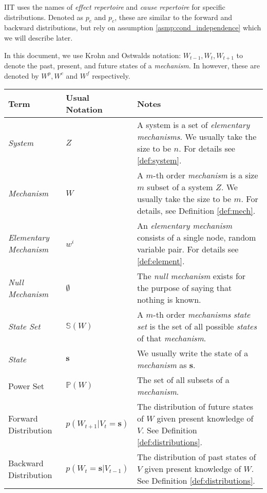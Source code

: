 \begin{definition}
	{IIT \cite{oizumi2014phenomenology} uses the names of \textit{effect repertoire} and \textit{cause repertoire} for specific distributions. Denoted as $p_e$ and $p_c$, these are similar to the forward and backward distributions, but rely on assumption \ref{asmp:cond_independence} which we will describe later. }
\end{definition}


\begin{remark}
	In this document, we use Krohn and Ostwalds  \cite{krohn2016computing} notation: $W_{t-1}, W_t, W_{t+1}$ to denote the past, present, and future states of a \textit{mechanism}. In \cite{oizumi2014phenomenology} however, these are denoted by $W^p, W^c$ and $W^f$ respectively.
\end{remark}

\begin{tabularx}{\textwidth}{ll X}
	Term & Usual Notation & Notes \\
	\hline
	\endfirsthead
	\hline
	\endhead
	\endfoot
	\hline
	\caption{Key Definitions and Notation} 
	\label{tab:defs}
	\endlastfoot
	\textit{System} & $Z$ & A system is a set of \textit{elementary mechanisms}. We usually take the size to be $n$. For details see \ref{def:system}.\\
		\hline
	\textit{Mechanism} & $W$ & A $m$-th order \textit{mechanism} is a size $m$  subset of a system $Z$. We usually take the size to be $m$. For details, see Definition \ref{def:mech}. \\
		\hline
	\textit{Elementary Mechanism} & $w^i$ & An \textit{elementary mechanism} consists of a single node, random variable pair. For details see \ref{def:element}.\\
		\hline
	\textit{Null Mechanism} & $\emptyset$ & The \textit{null mechanism} exists for the purpose of saying that nothing is known.\\
		\hline
	\textit{State Set} & $\mathbb{S}(W)$ & A $m$-th order \textit{mechanisms} \textit{state set} is the set of all possible \textit{states} of that \textit{mechanism}. \\
		\hline
	\textit{State} & $\mathbf{s}$ & We usually write the state of a \textit{mechanism} as $\mathbf{s}$.\\
		\hline
	Power Set & $\mathbb{P}(W)$ & The set of all subsets of a \textit{mechanism}.\\
		\hline
	Forward Distribution & $p(W_{t+1}|V_t=\mathbf{s})$ &The distribution of future states of $W$ given present knowledge of $V$. See Definition \ref{def:distributions}. \\
		\hline
	Backward Distribution & $p(W_{t}=\mathbf{s}|V_{t-1})$ & The distribution of past states of $V$ given present knowledge of $W$. See Definition \ref{def:distributions}.\\
\end{tabularx}









